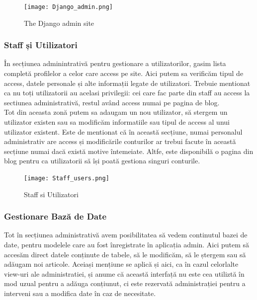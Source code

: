 \documentclass[11pt]{scrartcl} %
\begin{document}
\begin{figure}[h] %
	\centering
	\texttt{[image: Django\_admin.png]} %
	\caption{The Django admin site}
\end{figure}


\subsubsection{Staff și Utilizatori}



În secțiunea adminintrativă pentru gestionare a utilizatorilor, gasim lista completă profilelor a celor care access pe site. Aici putem sa verificăm tipul de access, datele personale și alte informații legate de utilizatori. Trebuie mentionat ca nu toți utilizatorii au acelasi privilegii: cei care fac parte din staff au access la sectiunea administrativă, restul având access numai pe pagina de blog. \\
Tot din aceasta zonă putem sa adaugam un nou utilizator, să stergem un utilizator existen sau sa modificăm informatiile sau tipul de access al unui utilizator existent. Este de mentionat că în această secțiune, numai personalul administrativ are access și modificările conturilor ar trebui facute în această secțiune numai dacă există motive întemeiate. Altfe, este disponibilă o pagina din blog pentru ca utilizatorii să își poată gestiona singuri conturile.

\begin{figure}[h] %
	\centering
	\texttt{[image: Staff\_users.png]} %
	\caption{Staff si Utilizatori}
\end{figure}


\subsubsection{Gestionare Bază de Date}

Tot în secțiunea administrativă avem posibilitatea să vedem continutul bazei de date, pentru modelele care au fost înregistrate în aplicația admin. Aici putem să accesăm direct datele conținute de  tabele, să le modificăm, să le ștergem sau să adăugam noi articole. Aceiași mențiune se aplică și aici, ca în cazul celorlalte view-uri ale administratiei, și anume că această interfață nu este cea utiliztă în mod uzual pentru a adăuga conțiunut, ci este rezervată administrației pentru a interveni sau a modifica date în caz de necesitate.
\end{document}
